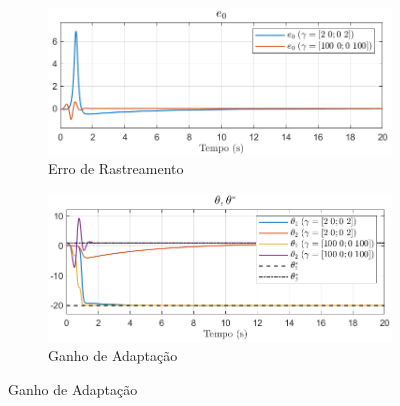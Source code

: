 \documentclass[10pt]{article}
\begin{document}
\begin{figure}[h!]
    \centering
    \begin{subfigure}[b]{0.3\textwidth}
        \centering
        \includegraphics[width=\textwidth]{img/fig05a.png}
        \caption{Erro de Rastreamento}
    \end{subfigure}
    \begin{subfigure}[b]{0.3\textwidth}
        \centering
        \includegraphics[width=\textwidth]{img/fig05b.png}
        \caption{Ganho de Adaptação}
    \end{subfigure}


\end{figure}
\end{document}
